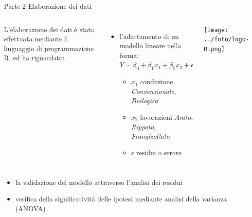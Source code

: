 \documentclass[10pt]{beamer}
\begin{document}
\begin{frame}{Parte 2 \small{Elaborazione dei dati}}
  \begin{minipage}[0.2\textheight]{\textwidth}
    \begin{columns}[T]
      L'elaborazione dei dati è stata effettuata mediante il linguaggio di
      programmazione R, ed ha riguardato:
      \begin{itemize}
        \item l'adattamento di un modello lineare nella forma:
        \vspace{0.25cm}
        $Y \sim \beta_0 + \beta_1x_1 + \beta_2x_2 + \epsilon$

        \begin{itemize}
          \item $x_1$ conduzione %
          \emph{Convenzionale}, \emph{Biologico}

          \item $x_2$ lavorazioni \newline \emph{Arato, Rippato,
            Frangizollato}

          \item $\epsilon$ residui o errore
        \end{itemize}
      \end{itemize}
      \texttt{[image: ../foto/logo-R.png]}
    \end{columns}
  \end{minipage}

  \begin{itemize}
    \item la validazione del modello attraverso l'analisi
    dei residui 
    \item verifica della significatività delle
    ipotesi mediante analisi della varianza (ANOVA)
  \end{itemize}
\end{frame}


\end{document}
